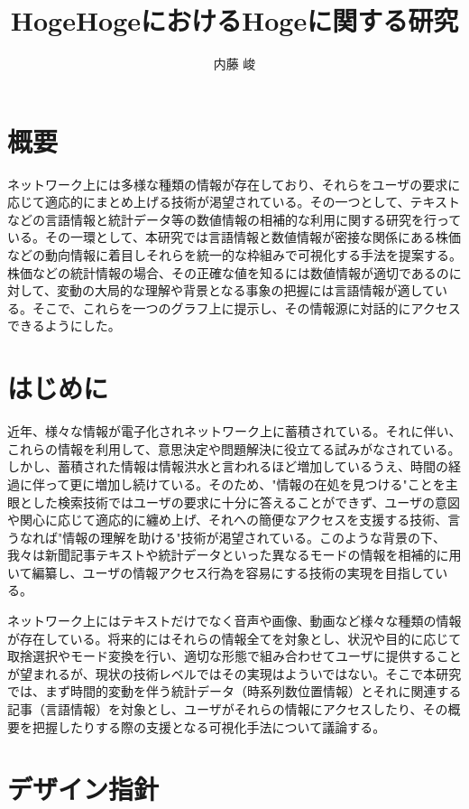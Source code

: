 \documentclass{matsushita-zemi}
\title{HogeHogeにおけるHogeに関する研究}
\author{内藤 峻}
\begin{document}
\maketitle

\section*{概要}
\label{abstract}
ネットワーク上には多様な種類の情報が存在しており、それらをユーザの要求に応じて適応的にまとめ上げる技術が渇望されている。その一つとして、テキストなどの言語情報と統計データ等の数値情報の相補的な利用に関する研究を行っている。その一環として、本研究では言語情報と数値情報が密接な関係にある株価などの動向情報に着目しそれらを統一的な枠組みで可視化する手法を提案する。株価などの統計情報の場合、その正確な値を知るには数値情報が適切であるのに対して、変動の大局的な理解や背景となる事象の把握には言語情報が適している。そこで、これらを一つのグラフ上に提示し、その情報源に対話的にアクセスできるようにした。

\section{はじめに}
\label{background} 
近年、様々な情報が電子化されネットワーク上に蓄積されている。それに伴い、これらの情報を利用して、意思決定や問題解決に役立てる試みがなされている。しかし、蓄積された情報は情報洪水と言われるほど増加しているうえ、時間の経過に伴って更に増加し続けている。そのため、"情報の在処を見つける"ことを主眼とした検索技術ではユーザの要求に十分に答えることができず、ユーザの意図や関心に応じて適応的に纏め上げ、それへの簡便なアクセスを支援する技術、言うなれば"情報の理解を助ける"技術が渇望されている。\cite{Elucignage}このような背景の下、我々は新聞記事テキストや統計データといった異なるモードの情報を相補的に用いて編纂し、ユーザの情報アクセス行為を容易にする技術の実現を目指している。

ネットワーク上にはテキストだけでなく音声や画像、動画など様々な種類の情報が存在している。将来的にはそれらの情報全てを対象とし、状況や目的に応じて取捨選択やモード変換を行い、適切な形態で組み合わせてユーザに提供することが望まれるが、現状の技術レベルではその実現はよういではない。そこで本研究では、まず時間的変動を伴う統計データ（時系列数位置情報）とそれに関連する記事（言語情報）を対象とし、ユーザがそれらの情報にアクセスしたり、その概要を把握したりする際の支援となる可視化手法について議論する。\cite{Elucignage-jsai}

\section{デザイン指針}
\end{document}

